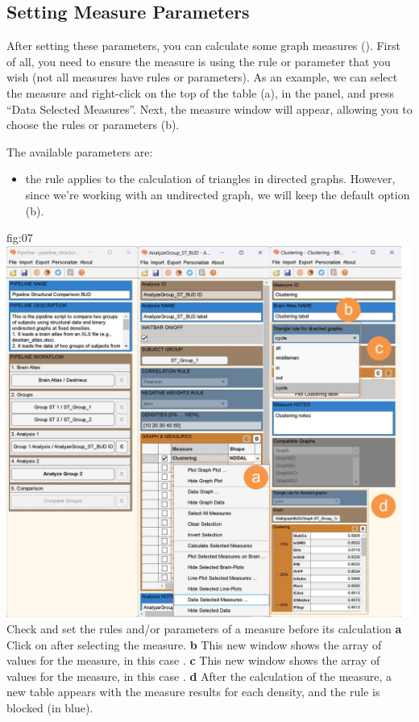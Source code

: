 \documentclass[justified]{tufte-handout}
\begin{document}
 
\subsection{Setting Measure Parameters}

 After setting these parameters, you can calculate some graph measures (). First of all, you need to ensure the measure is using the rule or parameter that you wish (not all measures have rules or parameters). As an example, we can select the measure  and right-click on the top of the table (a), in the  panel, and press “Data Selected Measures”. 
 Next, the measure window will appear, allowing you to choose the rules or parameters (b). 
 
 The available parameters are:
 \begin{itemize}
 	\item {} the rule applies to the calculation of triangles in directed graphs. However, since we're working with an undirected graph, we will keep the default option (b).
 \end{itemize}
 
 {fig:07}
 {
 	\includegraphics{fig07.jpg}
 }
 {Check and set the rules and/or parameters of a measure before its calculation}
 {
 	{\bf a} Click on  after selecting the measure.
 	{\bf b} This new window shows the array of values for the measure, in this case .
 	{\bf c} This new window shows the array of values for the measure, in this case .
 	{\bf d} After the calculation of the measure, a new table appears with the measure results for each density, and the rule is blocked (in blue).
 }
 
\end{document}
